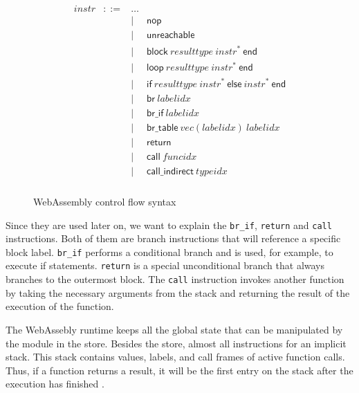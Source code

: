 \begin{figure}[h]
    \begin{equation}
        \begin{split}
            \begin{array}{llcl}
                \mathit{instr} &::=&
                \dots \\&&|&
                \mathsf{nop} \\&&|&
                \mathsf{unreachable} \\&&|&
                \mathsf{block}~\mathit{resulttype}~\mathit{instr}^\ast~\mathsf{end} \\&&|&
                \mathsf{loop}~\mathit{resulttype}~\mathit{instr}^\ast~\mathsf{end} \\&&|&
                \mathsf{if}~\mathit{resulttype}~\mathit{instr}^\ast~\mathsf{else}~\mathit{instr}^\ast~\mathsf{end} \\&&|&
                \mathsf{br}~\mathit{labelidx} \\&&|&
                \mathsf{br\_if}~\mathit{labelidx} \\&&|&
                \mathsf{br\_table}~\mathit{vec}(\mathit{labelidx})~\mathit{labelidx} \\&&|&
                \mathsf{return} \\&&|&
                \mathsf{call}~\mathit{funcidx} \\&&|&
                \mathsf{call\_indirect}~\mathit{typeidx} \\
            \end{array}
        \end{split}
    \end{equation}
    \caption{WebAssembly control flow syntax}
    \label{fig:control_flow}
\end{figure}

Since they are used later on, we want to explain the \lstinline{br_if}, \lstinline{return} and \lstinline{call} instructions. Both of them are branch instructions that will reference a specific block label. \lstinline{br_if} performs a conditional branch and is used, for example, to execute if statements. \lstinline{return} is a special unconditional branch that always branches to the outermost block. The \lstinline{call} instruction invokes another function by taking the necessary arguments from the stack and returning the result of the execution of the function.

The WebAssebly runtime keeps all the global state that can be manipulated by the module in the store. Besides the store, almost all instructions for an implicit stack. This stack contains values, labels, and call frames of active function calls. Thus, if a function returns a result, it will be the first entry on the stack after the execution has finished \autocite{noauthor_runtime_nodate}.

